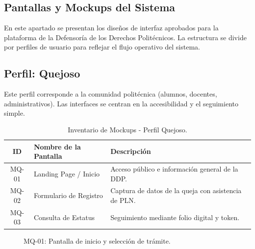 
\begin{appendices}

\chapter{Pantallas y Mockups del Sistema}
\label{anexo:pantallas}

En este apartado se presentan los diseños de interfaz aprobados para la plataforma de la Defensoría de los Derechos Politécnicos. La estructura se divide por perfiles de usuario para reflejar el flujo operativo del sistema.

\section{Perfil: Quejoso}
Este perfil corresponde a la comunidad politécnica (alumnos, docentes, administrativos). Las interfaces se centran en la accesibilidad y el seguimiento simple.

\begin{table}[htbp]
    \centering
    \small
    \begin{tabular}{|c|l|p{7cm}|}
    \hline
    \textbf{ID} & \textbf{Nombre de la Pantalla} & \textbf{Descripción} \\ \hline
    MQ-01 & Landing Page / Inicio & Acceso público e información general de la DDP. \\ \hline
    MQ-02 & Formulario de Registro & Captura de datos de la queja con asistencia de PLN. \\ \hline
    MQ-03 & Consulta de Estatus & Seguimiento mediante folio digital y token. \\ \hline
    \end{tabular}
    \caption{Inventario de Mockups - Perfil Quejoso.}
\end{table}

\begin{figure}[htbp]
    \centering
    \caption{MQ-01: Pantalla de inicio y selección de trámite.}
\end{figure}


\end{appendices}
